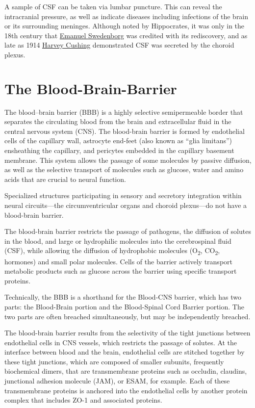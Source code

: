 A sample of CSF can be taken via lumbar puncture. This can reveal the intracranial pressure, as well as indicate diseases including infections of the brain or its surrounding meninges. Although noted by Hippocrates, it was only in the 18th century that \href{https://en.wikipedia.org/wiki/Emanuel_Swedenborg}{Emanuel Swedenborg} was credited with its rediscovery, and as late as 1914 \href{https://en.wikipedia.org/wiki/Harvey_Cushing}{Harvey Cushing} demonstrated CSF was secreted by the choroid plexus.

\hypertarget{the-blood-brain-barrier}{%
\section{The Blood-Brain-Barrier}\label{the-blood-brain-barrier}}

The blood--brain barrier (BBB) is a highly selective semipermeable border that separates the circulating blood from the brain and extracellular fluid in the central nervous system (CNS). The blood-brain barrier is formed by endothelial cells of the capillary wall, astrocyte end-feet (also known as ``glia limitans'') ensheathing the capillary, and pericytes embedded in the capillary basement membrane. This system allows the passage of some molecules by passive diffusion, as well as the selective transport of molecules such as glucose, water and amino acids that are crucial to neural function.

Specialized structures participating in sensory and secretory integration within neural circuits---the circumventricular organs and choroid plexus---do not have a blood-brain barrier.

The blood-brain barrier restricts the passage of pathogens, the diffusion of solutes in the blood, and large or hydrophilic molecules into the cerebrospinal fluid (CSF), while allowing the diffusion of hydrophobic molecules (O\textsubscript{2}, CO\textsubscript{2}, hormones) and small polar molecules. Cells of the barrier actively transport metabolic products such as glucose across the barrier using specific transport proteins.

Technically, the BBB is a shorthand for the Blood-CNS barrier, which has two parts: the Blood-Brain portion and the Blood-Spinal Cord Barrier portion. The two parts are often breached simultaneously, but may be independently breached.

The blood-brain barrier results from the selectivity of the tight junctions between endothelial cells in CNS vessels, which restricts the passage of solutes. At the interface between blood and the brain, endothelial cells are stitched together by these tight junctions, which are composed of smaller subunits, frequently biochemical dimers, that are transmembrane proteins such as occludin, claudins, junctional adhesion molecule (JAM), or ESAM, for example. Each of these transmembrane proteins is anchored into the endothelial cells by another protein complex that includes ZO-1 and associated proteins.

